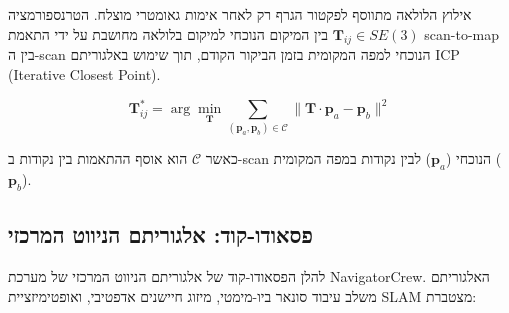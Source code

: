 אילוץ הלולאה מתווסף לפקטור הגרף רק לאחר אימות גאומטרי מוצלח. הטרנספורמציה $\mathbf{T}_{ij} \in SE(3)$ בין המיקום הנוכחי למיקום בלולאה מחושבת על ידי התאמת scan-to-map בין ה-scan הנוכחי למפה המקומית בזמן הביקור הקודם, תוך שימוש באלגוריתם ICP (Iterative Closest Point).

\begin{equation}
\mathbf{T}_{ij}^* = \arg\min_{\mathbf{T}} \sum_{(\mathbf{p}_a, \mathbf{p}_b) \in \mathcal{C}} \| \mathbf{T} \cdot \mathbf{p}_a - \mathbf{p}_b \|^2
\label{eq:ch06_icp}
\end{equation}

כאשר $\mathcal{C}$ הוא אוסף ההתאמות בין נקודות ב-scan הנוכחי ($\mathbf{p}_a$) לבין נקודות במפה המקומית ($\mathbf{p}_b$).

\subsection{פסאודו-קוד: אלגוריתם הניווט המרכזי}
\label{sec:ch06_pseudocode}

להלן הפסאודו-קוד של אלגוריתם הניווט המרכזי של מערכת NavigatorCrew. האלגוריתם משלב עיבוד סונאר ביו-מימטי, מיזוג חיישנים אדפטיבי, ואופטימיזציית SLAM מצטברת:


